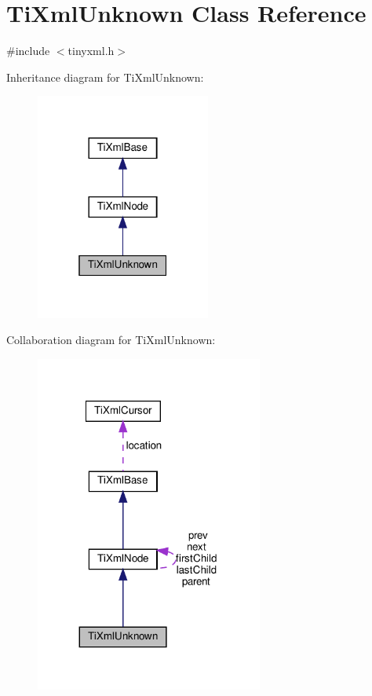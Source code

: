 \hypertarget{classTiXmlUnknown}{}\section{Ti\+Xml\+Unknown Class Reference}
\label{classTiXmlUnknown}


{\ttfamily \#include $<$tinyxml.\+h$>$}



Inheritance diagram for Ti\+Xml\+Unknown\+:
\nopagebreak
\begin{figure}[H]
\begin{center}
\leavevmode
\includegraphics[width=163pt]{classTiXmlUnknown__inherit__graph}
\end{center}
\end{figure}


Collaboration diagram for Ti\+Xml\+Unknown\+:
\nopagebreak
\begin{figure}[H]
\begin{center}
\leavevmode
\includegraphics[width=212pt]{classTiXmlUnknown__coll__graph}
\end{center}
\end{figure}
